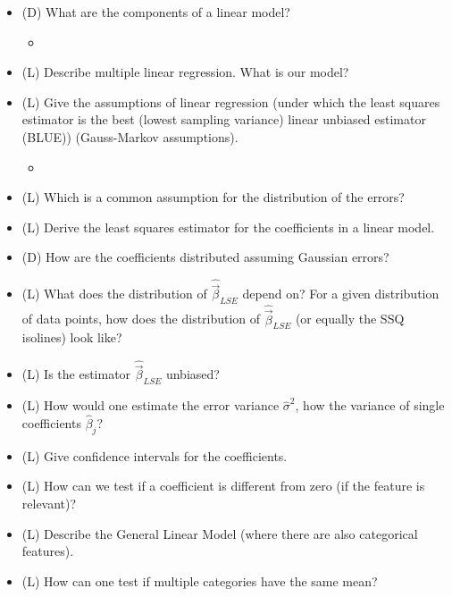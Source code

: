 \begin{itemize}
    \item (D) What are the components of a linear model?
    \begin{itemize}
        \item {}
    \end{itemize}
    \answerboxM
    \item (L) Describe multiple linear regression. What is our model?
    \answerboxM
    \item (L) Give the assumptions of linear regression (under which the least squares estimator is the best (lowest sampling variance) linear unbiased estimator (BLUE)) (Gauss-Markov assumptions).
    \begin{itemize}
        \item {}
    \end{itemize}
    \answerboxM
    \item (L) Which is a common assumption for the distribution of the errors?
    \answerboxS
    \item (L) Derive the least squares estimator for the coefficients in a linear model.
    \answerboxM
    \item (D) How are the coefficients distributed assuming Gaussian errors?
    \answerboxL
    \item (L) What does the distribution of $\hat{\vec{\beta}}_{LSE}$ depend on? For a given distribution of data points, how does the distribution of $\hat{\vec{\beta}}_{LSE}$ (or equally the SSQ isolines) look like?
    \answerboxL
    \item (L) Is the estimator $\hat{\vec{\beta}}_{LSE}$ unbiased?
    \answerboxS
    \item (L) How would one estimate the error variance $\hat{\sigma}^2$, how the variance of single coefficients $\hat{\beta}_j$?
    \answerboxM
    \item (L) Give confidence intervals for the coefficients.
    \answerboxM
    \item (L) How can we test if a coefficient is different from zero (if the feature is relevant)?
    \answerboxM
    \item (L) Describe the General Linear Model (where there are also categorical features).
    \answerboxM
    \item (L) How can one test if multiple categories have the same mean?

\end{itemize}

